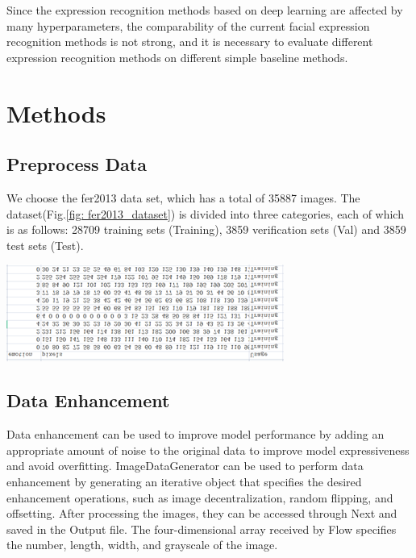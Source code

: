 \documentclass[a0,portrait]{a0poster}
\begin{document}
\begin{multicols}{2}
\quad Since the expression recognition methods based on deep learning are affected by many hyperparameters, the comparability of the current facial expression recognition methods is not strong, and it is necessary to evaluate different expression recognition methods on different simple baseline methods.


\section*{Methods}

\subsection*{Preprocess Data}

\quad We choose the fer2013 data set, which has a total of 35887 images. The dataset(Fig.\ref{fig: fer2013_dataset}) is divided into three categories, each of which is as follows: 28709 training sets (Training), 3859 verification sets (Val) and 3859 test sets (Test).

\begin{center}\vspace{1cm}
	\includegraphics[width=0.5\linewidth]{fer2013_dataset}
\end{center}\vspace{1cm}

\subsection*{Data Enhancement}

\quad Data enhancement can be used to improve model performance by adding an appropriate amount of noise to the original data to improve model expressiveness and avoid overfitting. ImageDataGenerator can be used to perform data enhancement by generating an iterative object that specifies the desired enhancement operations\cite{b1}, such as image decentralization, random flipping, and offsetting. After processing the images, they can be accessed through Next and saved in the Output file. The four-dimensional array received by Flow specifies the number, length, width, and grayscale of the image.


\end{multicols}
\end{document}
